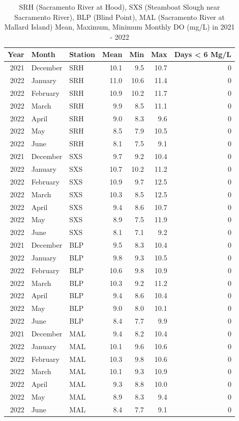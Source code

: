 \documentclass[
]{book}
\theoremstyle{definition}
\theoremstyle{definition}
\theoremstyle{definition}
\theoremstyle{definition}
\theoremstyle{remark}
\begin{document}
\begin{table}
\centering
\caption{SRH (Sacramento River at Hood), SXS (Steamboat Slough near Sacramento River), BLP (Blind Point), MAL (Sacramento River at Mallard Island) Mean, Maximum, Minimum Monthly DO (mg/L) in 2021 - 2022}
\centering
\begin{tabular}[t]{rllrrrr}
\hline
Year & Month & Station & Mean & Min & Max & Days < 6 Mg/L\\
\hline
2021 & December & SRH & 10.1 & 9.5 & 10.7 & 0\\
\hline
2022 & January & SRH & 11.0 & 10.6 & 11.4 & 0\\
\hline
2022 & February & SRH & 10.9 & 10.2 & 11.7 & 0\\
\hline
2022 & March & SRH & 9.9 & 8.5 & 11.1 & 0\\
\hline
2022 & April & SRH & 9.0 & 8.3 & 9.6 & 0\\
\hline
2022 & May & SRH & 8.5 & 7.9 & 10.5 & 0\\
\hline
2022 & June & SRH & 8.1 & 7.5 & 9.1 & 0\\
\hline
2021 & December & SXS & 9.7 & 9.2 & 10.4 & 0\\
\hline
2022 & January & SXS & 10.7 & 10.2 & 11.2 & 0\\
\hline
2022 & February & SXS & 10.9 & 9.7 & 12.5 & 0\\
\hline
2022 & March & SXS & 10.3 & 8.5 & 12.5 & 0\\
\hline
2022 & April & SXS & 9.4 & 8.6 & 10.7 & 0\\
\hline
2022 & May & SXS & 8.9 & 7.5 & 11.9 & 0\\
\hline
2022 & June & SXS & 8.1 & 7.1 & 9.2 & 0\\
\hline
2021 & December & BLP & 9.5 & 8.3 & 10.4 & 0\\
\hline
2022 & January & BLP & 9.8 & 9.3 & 10.5 & 0\\
\hline
2022 & February & BLP & 10.6 & 9.8 & 10.9 & 0\\
\hline
2022 & March & BLP & 10.3 & 9.2 & 11.2 & 0\\
\hline
2022 & April & BLP & 9.4 & 8.6 & 10.4 & 0\\
\hline
2022 & May & BLP & 9.0 & 8.0 & 10.1 & 0\\
\hline
2022 & June & BLP & 8.4 & 7.7 & 9.9 & 0\\
\hline
2021 & December & MAL & 9.4 & 8.2 & 10.4 & 0\\
\hline
2022 & January & MAL & 10.1 & 9.6 & 10.6 & 0\\
\hline
2022 & February & MAL & 10.3 & 9.8 & 10.6 & 0\\
\hline
2022 & March & MAL & 10.1 & 9.3 & 10.9 & 0\\
\hline
2022 & April & MAL & 9.3 & 8.8 & 10.0 & 0\\
\hline
2022 & May & MAL & 8.9 & 8.3 & 9.4 & 0\\
\hline
2022 & June & MAL & 8.4 & 7.7 & 9.1 & 0\\
\hline
\end{tabular}
\end{table}
\end{document}
